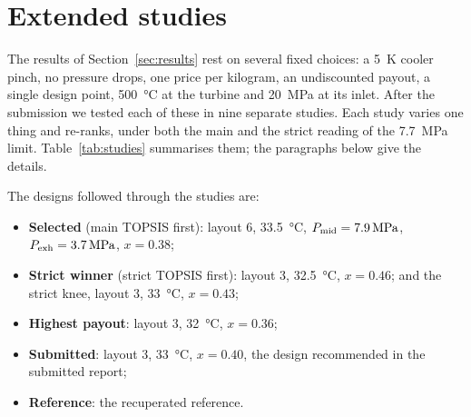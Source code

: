 \section{Extended studies}\label{sec:studies}
The results of Section~\ref{sec:results} rest on several fixed choices: a \SI{5}{K} cooler pinch, no pressure drops, one price per kilogram, an undiscounted payout, a single design point, \SI{500}{\celsius} at the turbine and \SI{20}{MPa} at its inlet. After the submission we tested each of these in nine separate studies. Each study varies one thing and re-ranks, under both the main and the strict reading of the \SI{7.7}{MPa} limit. Table~\ref{tab:studies} summarises them; the paragraphs below give the details.

The designs followed through the studies are:
\begin{itemize}
  \item \textbf{Selected} (main TOPSIS first): layout 6, \SI{33.5}{\celsius}, $P_\mathrm{mid} = \SI{7.9}{MPa}$, $P_\mathrm{exh} = \SI{3.7}{MPa}$, $x = 0.38$;
  \item \textbf{Strict winner} (strict TOPSIS first): layout 3, \SI{32.5}{\celsius}, $x = 0.46$; and the strict knee, layout 3, \SI{33}{\celsius}, $x = 0.43$;
  \item \textbf{Highest payout}: layout 3, \SI{32}{\celsius}, $x = 0.36$;
  \item \textbf{Submitted}: layout 3, \SI{33}{\celsius}, $x = 0.40$, the design recommended in the submitted report;
  \item \textbf{Reference}: the recuperated reference.
\end{itemize}

